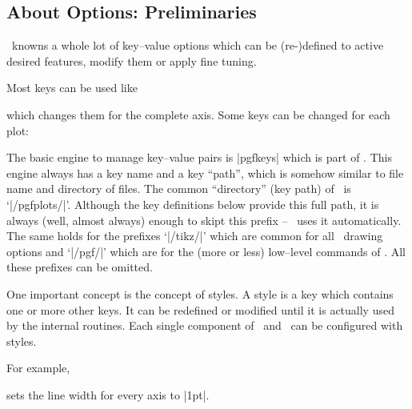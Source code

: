 \subsection{About Options: Preliminaries}
\PGFPlots\ knowns a whole lot of key--value options which can be (re-)defined to active desired features, modify them or apply fine tuning.

Most keys can be used like
\begin{codeexample}
\end{codeexample}
\noindent which changes them for the complete axis. Some keys can be changed for each plot:
\begin{codeexample}
\end{codeexample}

The basic engine to manage key--value pairs is |pgfkeys| which is part of \pgfname. This engine always has a key name and a key ``path'', which is somehow similar to file name and directory of files. The common ``directory'' (key path) of \PGFPlots\ is `|/pgfplots/|'. Although the key definitions below provide this full path, it is always (well, almost always) enough to skipt this prefix -- \PGFPlots\ uses it automatically. The same holds for the prefixes `|/tikz/|' which are common for all \Tikz\ drawing options and `|/pgf/|' which are for the (more or less) low--level commands of \pgfname. All these prefixes can be omitted.

One important concept is the concept of styles. A style is a key which contains one or more other keys. It can be redefined or modified until it is actually used by the internal routines. Each single component of \Tikz\ and \PGFPlots\ can be configured with styles.

For example,
\begin{codeexample}
\end{codeexample}
\noindent
sets the line width for every axis to |1pt|. 

